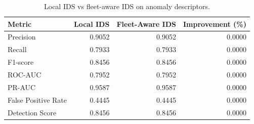 \begin{table}[t]
\centering
\begin{tabular}{lrrr}
\toprule
Metric & Local IDS & Fleet-Aware IDS & Improvement (\%) \\
\midrule
Precision & 0.9052 & 0.9052 & 0.0000 \\
Recall & 0.7933 & 0.7933 & 0.0000 \\
F1-score & 0.8456 & 0.8456 & 0.0000 \\
ROC-AUC & 0.7952 & 0.7952 & 0.0000 \\
PR-AUC & 0.9587 & 0.9587 & 0.0000 \\
False Positive Rate & 0.4445 & 0.4445 & 0.0000 \\
Detection Score & 0.8456 & 0.8456 & 0.0000 \\
\bottomrule
\end{tabular}
\caption{Local IDS vs fleet-aware IDS on anomaly descriptors.}
\label{tab:local-vs-fleet}
\end{table}
